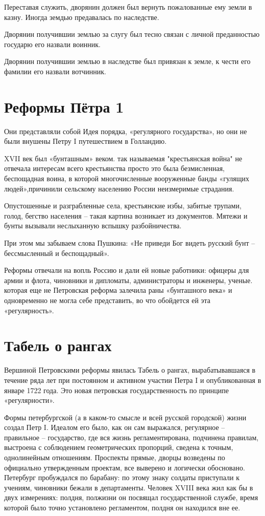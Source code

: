 \documentclass[12pt,a4paper]{article}
\begin{document}
Переставая служить, дворянин должен был вернуть пожалованные ему земли в казну.
Иногда земдью предавалась по наследстве.

Дворянин получившии землью за слугу был тесно связан с личной преданностью государю его назвали воинник. 
 
Дворянин получившии землью в наследстве был привязан к земле, к чести его фамилии его назвали вотчинник.
\section{Реформы Пётра 1}
Они представляли собой Идея порядка, «регулярного государства», но они не были внушены Петру I путешествием в Голландию.

XVII век был «бунташным» веком. так называемая "крестьянская война" не отвечала интересам всего крестьянства просто это была безмисленная, беспощадная воина, в которой многочисленные вооруженные банды «гулящих людей»,причинили сельскому населению России неизмеримые страдания.

Опустошенные и разграбленные села, крестьянские избы, забитые трупами, голод, бегство населения – такая картина возникает из документов. Мятежи и бунты вызывали неслыханную вспышку разбойничества. 
 
При этом мы забываем слова Пушкина: «Не приведи Бог видеть русский бунт – бессмысленный и беспощадный».

Реформы отвечали на вопль Россию и дали ей новые работники: офицеры для армии и флота, чиновники и дипломаты, администраторы и инженеры, ученые.
которая еще не Петровская реформа залечила раны «бунташного века» и одновременно не могла себе представить, во что обойдется ей эта «регулярность».
\section{Табель о рангах}
Вершиной Петровскими реформы явилась Табель
о рангах, вырабатывавшаяся в течение ряда лет при
постоянном и активном участии Петра I и опубликованная в январе 1722 года.  
Это новая  петровская государственность по  принципе «регулярности».

Формы петербургской (а в каком-то смысле и всей
русской городской) жизни создал Петр I. Идеалом его было,
как он сам выражался, регулярное – правильное –
государство, где вся жизнь регламентирована, подчинена
правилам, выстроена с соблюдением геометрических
пропорций, сведена к точным, однолинейным отношениям.
Проспекты прямые, дворцы возведены по официально
утвержденным проектам, все выверено и логически
обосновано.
Петербург пробуждался по барабану: по этому
знаку солдаты приступали к учениям, чиновники бежали
в департаменты. Человек XVIII  века жил как бы в двух
измерениях: полдня, полжизни он посвящал
государственной службе, время которой было точно
установлено регламентом, полдня он находился вне ее.
\end{document}
